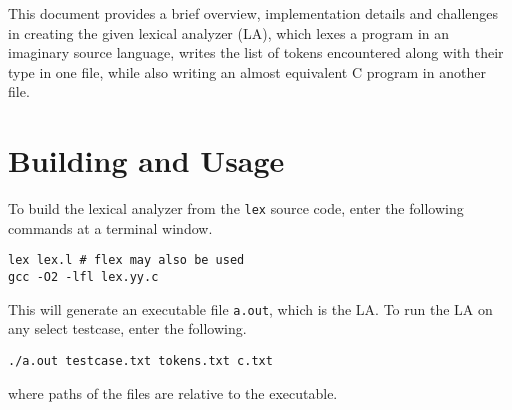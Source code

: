 \documentclass[journal,12pt,twocolumn]{IEEEtran}
\begin{document}
This document provides a brief overview, implementation details and challenges
in creating the given lexical analyzer (LA), which lexes a program in an
imaginary source language, writes the list of tokens encountered along with
their type in one file, while also writing an almost equivalent C program in
another file.

\section{Building and Usage}

To build the lexical analyzer from the \texttt{lex} source code, enter the following
commands at a terminal window.

\begin{lstlisting}
lex lex.l # flex may also be used
gcc -O2 -lfl lex.yy.c 
\end{lstlisting}

This will generate an executable file \texttt{a.out}, which is the LA.
To run the LA on any select testcase, enter the following.

\begin{lstlisting}
./a.out testcase.txt tokens.txt c.txt
\end{lstlisting}

where paths of the files are relative to the executable.
\end{document}
